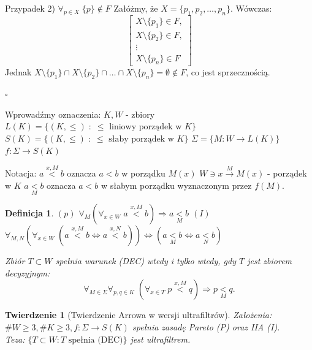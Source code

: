\documentclass[12pt,a4paper]{article}
\theoremstyle{break}
\newtheorem{definition}{Definicja}[section]
\newtheorem{theorem}{Twierdzenie}[section]
\begin{document}
	Przypadek 2) $\forall_{p \in X} \; \{p\} \notin F$  
	Załóżmy, że $X = \{p_1, p_2, \dots, p_n\}$.  
	Wówczas:
	\[
	\begin{bmatrix}
		X \setminus \{p_1\} \in F,\\
		X \setminus \{p_2\} \in F,\\
		\vdots\\
		X \setminus \{p_n\} \in F
	\end{bmatrix}
	\]
	Jednak $X \setminus \{p_1\} \cap X \setminus \{p_2\} \cap \dots \cap X \setminus \{p_n\} = \emptyset \notin F$, co jest sprzecznością.  
	
	\begin{flushright}$\square$\end{flushright}
	
	Wprowadźmy oznaczenia:  
	$K, W$ - zbiory  
	$L(K) = \{ (K, \leq) \; : \; \leq \text{ liniowy porządek w } K \}$  
	$S(K) = \{ (K, \leq) \; : \; \leq \text{ słaby porządek w } K \}$  
	$\Sigma = \{ M : W \to L(K) \}$  
	$f : \Sigma \to S(K)$  
	
	Notacja:  
	$a \overset{x, M}{<} b$ oznacza $a < b$ w porządku $M(x)$  
	$W \ni x \overset{M}{\to} M(x)$ - porządek w $K$  
	$a \underset{M}{<} b$ oznacza $a < b$ w słabym porządku wyznaczonym przez $f(M)$.
	
	\begin{definition}
		$(p)$ $\forall_M (\forall_{x \in W} \; a \overset{x, M}{<} b) \Rightarrow a \underset{M}{<} b$  
		$(I)$ $\forall_{M, N} (\forall_{x \in W} \; (a \overset{x, M}{<} b \iff a \overset{x, N}{<} b)) \iff (a \underset{M}{<} b \iff a \underset{N}{<} b)$  
		
		Zbiór $T \subset W$ spełnia warunek (DEC) wtedy i tylko wtedy, gdy $T$ jest zbiorem decyzyjnym:  
		\[
		\forall_{M \in \Sigma} \forall_{p, q \in K} \; (\forall_{x \in T} \; p \overset{x, M}{<} q) \Rightarrow p \underset{M}{<} q.
		\]
	\end{definition}
	
	\begin{theorem}[Twierdzenie Arrowa w wersji ultrafiltrów]
		Założenia: $\# W \geq 3, \# K \geq 3, f : \Sigma \to S(K)$ spełnia zasadę Pareto (P) oraz IIA (I). \\
		Teza: $\{T \subset W : T \text{ spełnia (DEC)}\}$ jest ultrafiltrem.
	\end{theorem}
	
\end{document}

